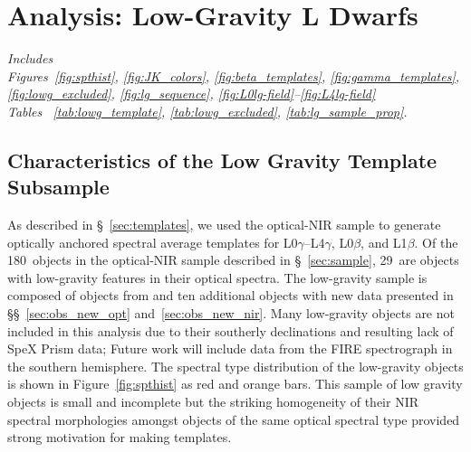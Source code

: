 \documentclass[12pt,preprint]{aastex}
\newcommand{\sample}{180}
\newcommand{\optLowG}{29}
\begin{document}

\clearpage
\section{Analysis: Low-Gravity L Dwarfs}
\label{sec:lowg}

\emph{Includes \\
Figures~\ref{fig:spthist}, \ref{fig:JK_colors}, \ref{fig:beta_templates}, \ref{fig:gamma_templates}, \ref{fig:lowg_excluded}, \ref{fig:lg_sequence}, \ref{fig:L0lg-field}--\ref{fig:L4lg-field}\\
Tables ~\ref{tab:lowg_template}, \ref{tab:lowg_excluded}, \ref{tab:lg_sample_prop}.}

\subsection{Characteristics of the Low Gravity Template Subsample}
\label{sec:templates_lowg}

As described in \S~\ref{sec:templates}, we used the optical-NIR sample to generate optically anchored spectral average templates for L0$\gamma$--L4$\gamma$, L0$\beta$, and L1$\beta$.
Of the \sample~objects in the optical-NIR sample described in \S~\ref{sec:sample}, \optLowG~are objects with low-gravity features in their optical spectra.
The low-gravity sample is composed of objects from \citet{Cruz07,Kirkpatrick08,Cruz09_lowg} and ten additional objects with new data presented in \S\S~\ref{sec:obs_new_opt} and~\ref{sec:obs_new_nir}.
Many low-gravity objects are not included in this analysis due to their southerly declinations and resulting lack of SpeX Prism data; Future work will include data from the FIRE spectrograph in the southern hemisphere.
The spectral type distribution of the low-gravity objects is shown in Figure~\ref{fig:spthist} as red and orange bars.
This sample of low gravity objects is small and incomplete but the striking homogeneity of their NIR spectral morphologies amongst objects of the same optical spectral type provided strong motivation for making templates.
\end{document}
